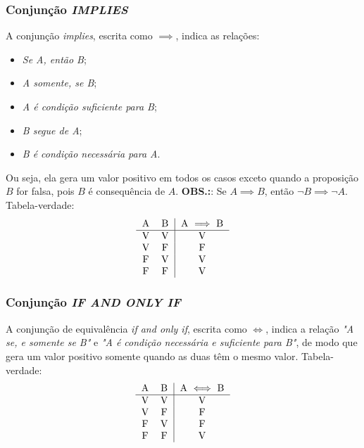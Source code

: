 \documentclass{article}
\begin{document}
\subsubsection{Conjunção \emph{IMPLIES}}
A conjunção \emph{implies}, escrita como $\implies$, indica as relações:
\begin{itemize}
    \item \emph{Se A, então B};
    \item \emph{A somente, se B};
    \item \emph{A é condição suficiente para B};
    \item \emph{B segue de A};
    \item \emph{B é condição necessária para A}.
\end{itemize}
Ou seja, ela gera um valor positivo em todos os casos exceto quando a proposição $B$ for falsa, pois $B$ é consequência de $A$. 
\textbf{OBS.:}: Se $A \implies B$, então $\lnot B \implies \lnot A$.
Tabela-verdade:
\begin{align*}
    \begin{tabular}{cc|c}
         A & B & A $\implies$ B  \\
         \hline
         V & V & V \\
         V & F & F \\
         F & V & V \\
         F & F & V \\
    \end{tabular}
\end{align*}

\subsubsection{Conjunção \emph{IF AND ONLY IF}}
A conjunção de equivalência \emph{if and only if}, escrita como $\iff$, indica a relação \emph{"A se, e somente se B"} e \emph{"A é condição necessária e suficiente para B"}, de modo que gera um valor positivo somente quando as duas têm o mesmo valor.
Tabela-verdade:
\begin{align*}
    \begin{tabular}{cc|c}
         A & B & A $\iff$ B  \\
         \hline
         V & V & V \\
         V & F & F \\
         F & V & F \\
         F & F & V \\
    \end{tabular}
\end{align*}
\end{document}
